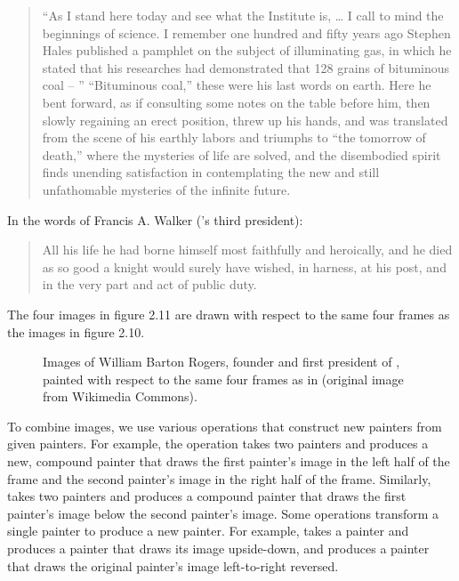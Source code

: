 {	\begin{quote}
		“As I stand here today and see what the Institute is, … I call to mind the beginnings of science.
		I remember one hundred and fifty years ago Stephen Hales published a pamphlet on the subject of illuminating gas, in which he stated that his researches had demonstrated that 128 grains of bituminous coal -- ” “Bituminous coal,” these were his last words on earth.
		Here he bent forward, as if consulting some notes on the table before him, then slowly regaining an erect position, threw up his hands, and was translated from the scene of his earthly labors and triumphs to “the tomorrow of death,” where the mysteries of life are solved, and the disembodied spirit finds unending satisfaction in contemplating the new and still unfathomable mysteries of the infinite future.
	\end{quote}

	In the words of Francis A. Walker (’s third president):

	\begin{quote}
		All his life he had borne himself most faithfully and heroically, and he died  as so good a knight would surely have wished, in harness, at his post, and in the very part and act of public duty.
	\end{quote}
}
The four images in figure 2.11 are drawn with respect to the same four frames as the  images in figure 2.10.

\begin{figure}[tb]
	\centering
	
	\caption{
		Images of William Barton Rogers, founder and first president of , painted with respect to the same four frames as in  (original image from Wikimedia Commons).
	}
	\label{Figure 2.11}
\end{figure}

To combine images, we use various operations that construct new painters from given painters.
For example, the  operation takes two painters and produces a new, compound painter that draws the first painter’s image in the left half of the frame and the second painter’s image in the right half of the frame.
Similarly,  takes two painters and produces a compound painter that draws the first painter’s image below the second painter’s image.
Some operations transform a single painter to produce a new painter.
For example,  takes a painter and produces a painter that draws its image upside-down, and  produces a painter that draws the original painter’s image left-to-right reversed.


